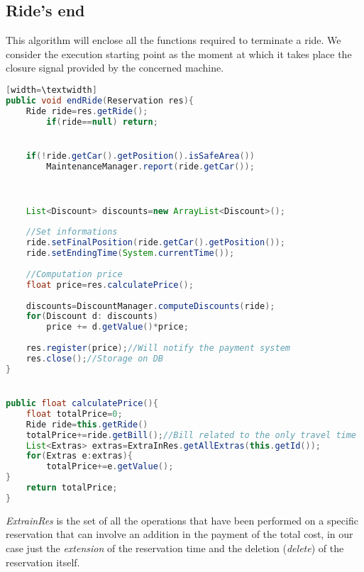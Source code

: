 \documentclass[10pt, a4paper,titlepage]{article}
\begin{document}
\subsection*{Ride's end}
This algorithm will enclose all the functions required to terminate a ride. We consider the execution starting point as the moment at which it takes place the closure signal provided by the concerned machine.
\begin{lstlisting}[language=Java][width=\textwidth]
public void endRide(Reservation res){
    Ride ride=res.getRide();
        if(ride==null) return;


    if(!ride.getCar().getPosition().isSafeArea())
        MaintenanceManager.report(ride.getCar());
    


    List<Discount> discounts=new ArrayList<Discount>();
    
    //Set informations
    ride.setFinalPosition(ride.getCar().getPosition());
    ride.setEndingTime(System.currentTime());
    
    //Computation price
    float price=res.calculatePrice();
    
    discounts=DiscountManager.computeDiscounts(ride);
    for(Discount d: discounts)
        price += d.getValue()*price;        
    
    res.register(price);//Will notify the payment system
    res.close();//Storage on DB
}


public float calculatePrice(){
    float totalPrice=0;
    Ride ride=this.getRide()
    totalPrice+=ride.getBill();//Bill related to the only travel time
    List<Extras> extras=ExtraInRes.getAllExtras(this.getId());
    for(Extras e:extras){
        totalPrice+=e.getValue();   
}
    return totalPrice;
}
\end{lstlisting}
\bigskip
\emph{ExtrainRes} is the set of all the operations that have been performed on a specific reservation that can involve an addition in the payment of the total cost, in our case just the \emph{extension} of the reservation time and the deletion (\emph{delete}) of the reservation itself. 
\end{document}

